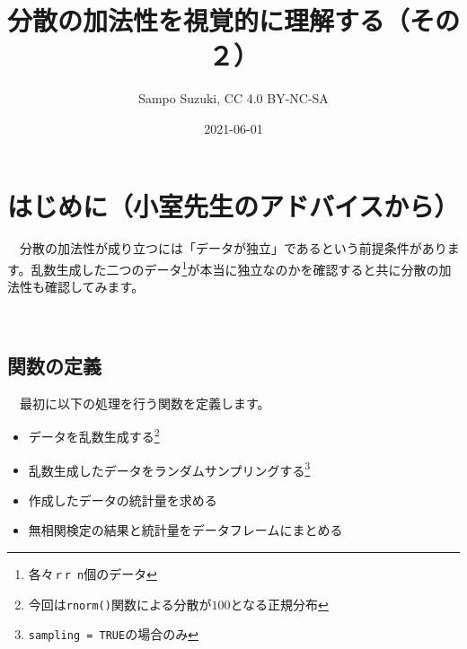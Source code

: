 \documentclass[a4paper]{tufte-handout}
\title[分散の加法性を視覚的に理解する（その２）]{分散の加法性を視覚的に理解する（その２）}
\author{Sampo Suzuki, CC 4.0 BY-NC-SA}
\date{2021-06-01}
\providecommand{\tightlist}{%
  \setlength{\itemsep}{0pt}\setlength{\parskip}{0pt}}
\begin{document}
\maketitle




\hypertarget{ux306fux3058ux3081ux306bux5c0fux5ba4ux5148ux751fux306eux30a2ux30c9ux30d0ux30a4ux30b9ux304bux3089}{%
\section{\texorpdfstring{\textbf{はじめに}（小室先生のアドバイスから）}{はじめに（小室先生のアドバイスから）}}\label{ux306fux3058ux3081ux306bux5c0fux5ba4ux5148ux751fux306eux30a2ux30c9ux30d0ux30a4ux30b9ux304bux3089}}

　分散の加法性が成り立つには「データが独立」であるという前提条件があります。乱数生成した二つのデータ\footnote{各々\texttt{ｒr\ n}個のデータ}が本当に独立なのかを確認すると共に分散の加法性も確認してみます。

　

\hypertarget{ux95a2ux6570ux306eux5b9aux7fa9}{%
\subsection{\texorpdfstring{\textbf{関数の定義}}{関数の定義}}\label{ux95a2ux6570ux306eux5b9aux7fa9}}

　最初に以下の処理を行う関数を定義します。

\begin{itemize}
\tightlist
\item
  データを乱数生成する\footnote{今回は\texttt{rnorm()}関数による分散が\(100\)となる正規分布}
\item
  乱数生成したデータをランダムサンプリングする\footnote{\texttt{sampling\ =\ TRUE}の場合のみ}
\item
  作成したデータの統計量を求める
\item
  無相関検定の結果と統計量をデータフレームにまとめる
\end{itemize}
\end{document}
